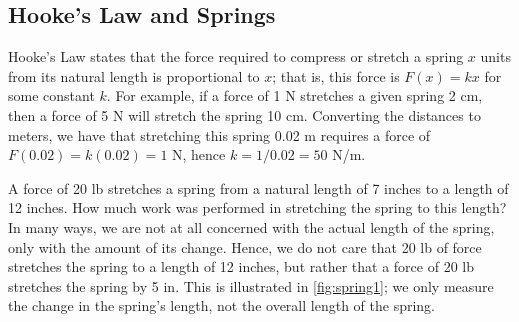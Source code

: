 \subsection{Hooke's Law and Springs}

Hooke's Law states that the force required to compress or stretch a spring $x$ units from its natural length is proportional to $x$; that is, this force is $F(x) = kx$ for some constant $k$. For example, if a force of 1 N stretches a given spring 2 cm, then a force of 5 N will stretch the spring 10 cm. Converting the distances to meters, we have that stretching this spring 0.02 m requires a force of $F(0.02) = k(0.02) = 1$ N, hence $k = 1/0.02 = 50$ N/m. 

\begin{example}\label{ex_spring1}
A force of 20 lb stretches a spring from a natural length of 7 inches to a length of 12 inches. How much work was performed in stretching the spring to this length?
\solution
In many ways, we are not at all concerned with the actual length of the spring, only with the amount of its change. Hence, we do not care that 20 lb of force stretches the spring to a length of 12 inches, but rather that a force of 20 lb stretches the spring by 5 in. This is illustrated in \autoref{fig:spring1}; we only measure the change in the spring's length, not the overall length of the spring.


\end{example}
